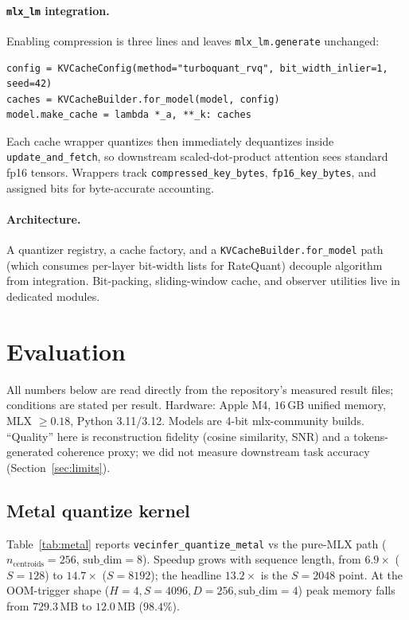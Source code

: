 \documentclass[11pt]{article}
\begin{document}
\paragraph{\texttt{mlx\_lm} integration.} Enabling compression is three lines
and leaves \texttt{mlx\_lm.generate} unchanged:
\begin{verbatim}
config = KVCacheConfig(method="turboquant_rvq", bit_width_inlier=1, seed=42)
caches = KVCacheBuilder.for_model(model, config)
model.make_cache = lambda *_a, **_k: caches
\end{verbatim}
Each cache wrapper quantizes then immediately dequantizes inside
\texttt{update\_and\_fetch}, so downstream scaled-dot-product attention sees
standard fp16 tensors. Wrappers track \texttt{compressed\_key\_bytes},
\texttt{fp16\_key\_bytes}, and assigned bits for byte-accurate accounting.

\paragraph{Architecture.} A quantizer registry, a cache factory, and a
\texttt{KVCacheBuilder.for\_model} path (which consumes per-layer bit-width
lists for RateQuant) decouple algorithm from integration. Bit-packing,
sliding-window cache, and observer utilities live in dedicated modules.

\section{Evaluation}
\label{sec:eval}
All numbers below are read directly from the repository's measured result
files; conditions are stated per result. Hardware: Apple M4, $16\,\mathrm{GB}$
unified memory, MLX $\ge 0.18$, Python 3.11/3.12. Models are 4-bit
mlx-community builds. ``Quality'' here is reconstruction fidelity (cosine
similarity, SNR) and a tokens-generated coherence proxy; we did not measure
downstream task accuracy (Section~\ref{sec:limits}).

\subsection{Metal quantize kernel}
Table~\ref{tab:metal} reports \texttt{vecinfer\_quantize\_metal} vs the
pure-MLX path ($n_{\mathrm{centroids}}{=}256$, $\text{sub\_dim}{=}8$). Speedup
grows with sequence length, from $6.9\times$ ($S{=}128$) to $14.7\times$
($S{=}8192$); the headline $13.2\times$ is the $S{=}2048$ point. At the
OOM-trigger shape ($H{=}4,S{=}4096,D{=}256,\text{sub\_dim}{=}4$) peak memory
falls from $729.3\,\mathrm{MB}$ to $12.0\,\mathrm{MB}$ ($98.4\%$).
\end{document}
